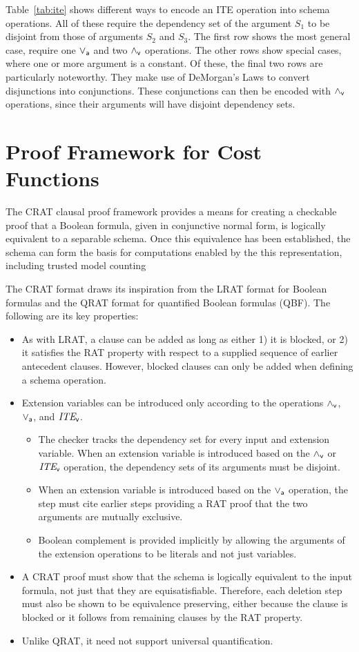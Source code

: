 \documentclass{llncs}
\newcommand{\pand}{\mathbin{\land_{\sf v}}}
\newcommand{\por}{\mathbin{\lor_{\sf a}}}
\newcommand{\pite}{\mbox{\it ITE}_{\sf v}}
\begin{document}
Table~\ref{tab:ite} shows different ways to encode an ITE operation
into schema operations.  All of these require the dependency set of
the argument $S_1$ to be disjoint from those of arguments $S_2$ and
$S_3$.  The first row shows the most general case, require one $\por$
and two $\pand$ operations.  The other rows show special cases, where
one or more argument is a constant.  Of these, the final two rows are
particularly noteworthy.  They make use of DeMorgan's Laws to convert
disjunctions into conjunctions.  These conjunctions can then be
encoded with $\pand$ operations, since their arguments will have
disjoint dependency sets.

\section{Proof Framework for Cost Functions}

The CRAT clausal proof framework provides a means for creating a
checkable proof that a Boolean formula, given in conjunctive normal
form, is logically equivalent to a separable schema.  Once this
equivalence has been established, the schema can form the basis
for computations enabled by the
this representation, including trusted model counting 

The CRAT format draws its inspiration from the LRAT format for Boolean formulas and the
QRAT format for
quantified Boolean formulas (QBF).  The following are its key properties:
\begin{itemize}
\item As with LRAT, a clause can be added as long as either 1) it is
  blocked, or 2) it satisfies the RAT property with respect to a supplied sequence
  of earlier antecedent clauses.  However, blocked clauses can only be added when defining a schema operation.
\item  Extension variables can be introduced only according to the operations $\pand$, $\por$, and $\pite$.
\begin{itemize}
\item The checker tracks the dependency set for every input and
  extension variable.  When an extension variable is introduced based
  on the $\pand$ or $\pite$ operation, the dependency sets of its arguments must
  be disjoint.
\item When an extension variable is introduced based on the $\por$
  operation, the step must cite earlier steps providing a RAT proof
  that the two arguments are mutually exclusive.
\item Boolean complement is provided implicitly by allowing the
  arguments of the extension operations to be literals and not just
  variables.
\end{itemize}
\item A CRAT proof must show that the schema is logically equivalent
  to the input formula, not just that they are equisatisfiable.
  Therefore, each deletion step must also be shown to be equivalence
  preserving, either because the clause is blocked or it follows from
  remaining clauses by the RAT property.
\item Unlike QRAT, it need not support universal quantification.
\end{itemize}
\end{document}
